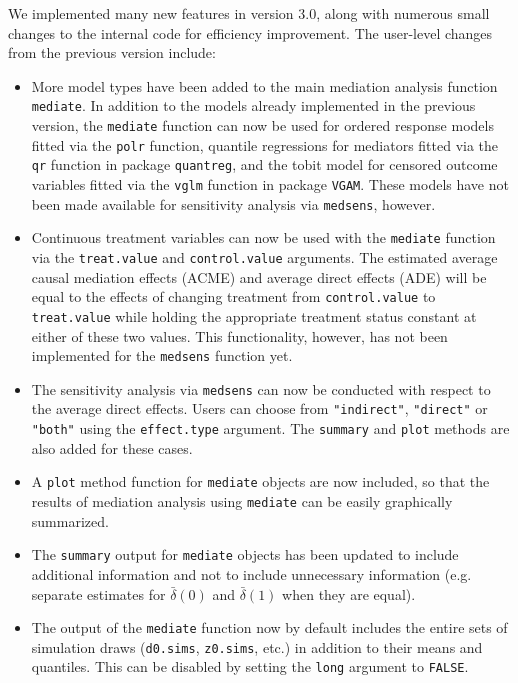 \documentclass[11pt,letterpaper]{article}
\theoremstyle{plain}
\begin{document}
We implemented many new features in version 3.0,
along with numerous small changes to the internal code for efficiency
improvement.  The user-level changes from the previous version include:

\begin{itemize}
\item More model types have been added to the main mediation analysis function {\tt mediate}.
In addition to the models already implemented in the previous version, the {\tt mediate}
function can now be used for ordered response models fitted via the {\tt polr}
function, quantile regressions for mediators fitted via the {\tt qr} function in package
{\tt quantreg}, and the tobit model for censored outcome variables fitted via the
{\tt vglm} function in package {\tt VGAM}.  These models have not been made available
for sensitivity analysis via {\tt medsens}, however.

\item Continuous treatment variables can now be used with the {\tt mediate} function
via the {\tt treat.value} and {\tt control.value} arguments.  The estimated average
causal mediation effects (ACME) and average direct effects (ADE) will be equal to the
effects of changing treatment from {\tt control.value} to {\tt treat.value} while
holding the appropriate treatment status constant at either of these two values.
This functionality, however, has not been implemented for the {\tt medsens} function yet.

\item The sensitivity analysis via {\tt medsens} can now be conducted with respect
to the average direct effects.  Users can choose from {\tt "indirect"}, {\tt "direct"}
or {\tt "both"} using the {\tt effect.type} argument.  The {\tt summary} and {\tt plot}
methods are also added for these cases.

\item A {\tt plot} method function for {\tt mediate} objects are now included,
so that the results of mediation analysis using {\tt mediate} can be easily graphically
summarized.

\item The {\tt summary} output for {\tt mediate} objects has been updated to include
additional information and not to include unnecessary information (e.g. separate estimates
for $\bar\delta(0)$ and $\bar\delta(1)$ when they are equal).

\item The output of the {\tt mediate} function now by default includes the entire sets of
simulation draws ({\tt d0.sims}, {\tt z0.sims}, etc.) in addition to their means
and quantiles.  This can be disabled by setting the {\tt long} argument to {\tt FALSE}.


\end{itemize}
\end{document}
